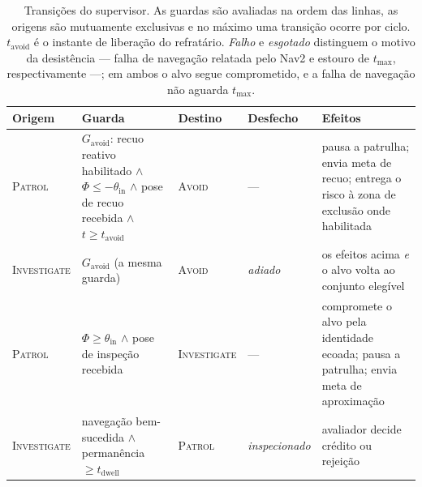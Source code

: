 \begin{table}[htb]
\centering
\caption{Transições do supervisor. As guardas são avaliadas na ordem das linhas, as
origens são mutuamente exclusivas e no máximo uma transição ocorre por ciclo.
$t_{\text{avoid}}$ é o instante de liberação do refratário. \emph{Falho} e
\emph{esgotado} distinguem o motivo da desistência --- falha de navegação relatada
pelo Nav2 e estouro de $t_{\max}$, respectivamente ---; em ambos o alvo segue
comprometido, e a falha de navegação não aguarda $t_{\max}$.}
\label{tab:prop-transicoes}
\scriptsize
\setlength{\tabcolsep}{3pt}
\begin{tabular}{p{}p{}p{}p{}p{}}
\hline
\textbf{Origem} & \textbf{Guarda} & \textbf{Destino} & \textbf{Desfecho} &
\textbf{Efeitos}\\
\hline
\textsc{Patrol} &
$G_{\text{avoid}}$: recuo reativo habilitado $\wedge$ $\Phi\le-\theta_{\text{in}}$
$\wedge$ pose de recuo recebida $\wedge$ $t\ge t_{\text{avoid}}$ &
\textsc{Avoid} & --- &
pausa a patrulha; envia meta de recuo; entrega o risco à zona de exclusão onde
habilitada\\
\hline
\textsc{Investigate} & $G_{\text{avoid}}$ (a mesma guarda) &
\textsc{Avoid} & \emph{adiado} &
os efeitos acima \emph{e} o alvo volta ao conjunto elegível\\
\hline
\textsc{Patrol} &
$\Phi\ge\theta_{\text{in}}$ $\wedge$ pose de inspeção recebida &
\textsc{Investigate} & --- &
compromete o alvo pela identidade ecoada; pausa a patrulha; envia meta de aproximação\\
\hline
\textsc{Investigate} & navegação bem-sucedida $\wedge$ permanência $\ge t_{\text{dwell}}$ &
\textsc{Patrol} & \emph{inspecionado} & avaliador decide crédito ou rejeição\\

\end{tabular}
\end{table}
